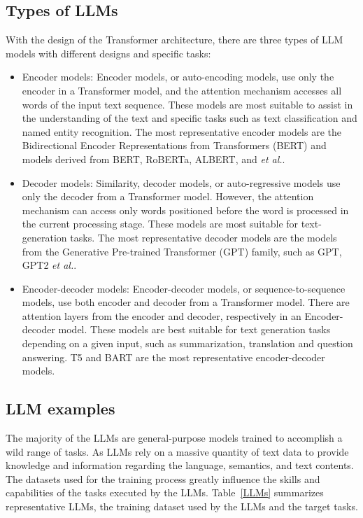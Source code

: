 \subsection{Types of LLMs}
With the design of the Transformer architecture, there are three types of LLM models with different designs and specific tasks:
\begin{itemize}
    \item Encoder models: Encoder models, or auto-encoding models, use only the encoder in a Transformer model, and the attention mechanism accesses all words of the input text sequence.  These models are most suitable to assist in the understanding of the text and specific tasks such as text classification and named entity recognition.  The most representative encoder models are the Bidirectional Encoder Representations from Transformers (BERT) and models derived from BERT, RoBERTa, ALBERT, and \textit{et al.}.
    \item Decoder models: Similarity, decoder models, or auto-regressive models use only the decoder from a Transformer model. However, the attention mechanism can access only words positioned before the word is processed in the current processing stage.  These models are most suitable for text-generation tasks.  The most representative decoder models are the models from the Generative Pre-trained Transformer (GPT) family, such as GPT, GPT2 \textit{et al.}.
    \item Encoder-decoder models: Encoder-decoder models, or sequence-to-sequence models, use both encoder and decoder from a Transformer model. There are attention layers from the encoder and decoder, respectively in an Encoder-decoder model.
    These models are best suitable for text generation tasks depending on a given input, such as summarization, translation and question answering.  T5 and BART are the most representative encoder-decoder models. 
\end{itemize}

\subsection{LLM examples}
The majority of the LLMs are general-purpose models trained to accomplish a wild range of tasks. As LLMs rely on a massive quantity of text data to provide knowledge and information regarding the language, semantics, and text contents. The datasets used for the training process greatly influence the skills and capabilities of the tasks executed by the LLMs.  Table~\ref{LLMs} summarizes representative LLMs, the training dataset used by the LLMs and the target tasks.


